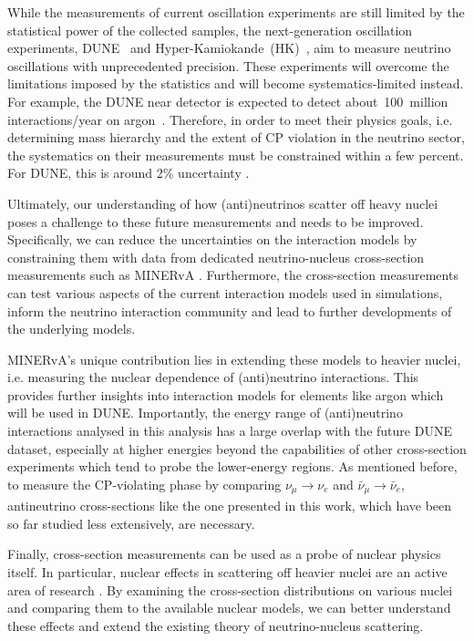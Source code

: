 While the measurements of current oscillation experiments are still limited by the statistical power of the collected samples, the next-generation oscillation experiments, DUNE~\cite{abi2020deep} and Hyper-Kamiokande~(HK)~\cite{protocollaboration2018hyperkamiokande}, aim to measure neutrino oscillations with unprecedented precision. These experiments will overcome the limitations imposed by the statistics and will become systematics-limited instead. For example, the DUNE near detector is expected to detect about~100~million interactions/year on argon~\cite{abi2020deep}. Therefore, in order to meet their physics goals, i.e. determining mass hierarchy and the extent of CP violation in the neutrino sector, the systematics on their measurements must be constrained within a few percent. For DUNE, this is around 2\% uncertainty \cite{abi2020deep}. 

Ultimately, our understanding of how (anti)neutrinos scatter off heavy nuclei poses a challenge to these future measurements and needs to be improved. Specifically, we can reduce the uncertainties on the interaction models by constraining them with data from dedicated neutrino-nucleus cross-section measurements such as MINERvA \cite{Aliaga_2014}. Furthermore, the cross-section measurements can test various aspects of the current interaction models used in simulations, inform the neutrino interaction community and lead to further developments of the underlying models. 

MINERvA's unique contribution lies in extending these models to heavier nuclei, i.e. measuring the nuclear dependence of (anti)neutrino interactions. This provides further insights into interaction models for elements like argon which will be used in DUNE. Importantly, the energy range of (anti)neutrino interactions analysed in this analysis has a large overlap with the future DUNE dataset, especially at higher energies beyond the capabilities of other cross-section experiments which tend to probe the lower-energy regions.
As mentioned before, to measure the CP-violating phase by comparing $\nu_{\mu} \xrightarrow[]{} \nu_e$ and $\bar{\nu}_{\mu} \xrightarrow[]{} \bar{\nu}_e$, antineutrino cross-sections like the one presented in this work, which have been so far studied less extensively, are necessary.  

Finally, cross-section measurements can be used as a probe of nuclear physics itself. In particular, nuclear effects in scattering off heavier nuclei are an active area of research \cite{doi:10.1146/annurev-nucl-102115-044720}. By examining the cross-section distributions on various nuclei and comparing them to the available nuclear models, we can better understand these effects and extend the existing theory of neutrino-nucleus scattering.

